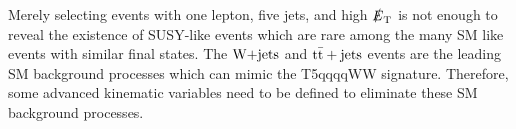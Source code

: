 Merely selecting events with one lepton, five jets, and high $\slashed{E}_{\rm T}$ is not enough to reveal the existence of SUSY-like events which are rare among the many SM like events with similar final states. The $\textrm{W+jets}$ and ${\rm t\bar{t}+jets}$ events are the leading SM background processes which can mimic the T5qqqqWW signature. Therefore, some advanced kinematic variables need to be defined to eliminate these SM background processes.
